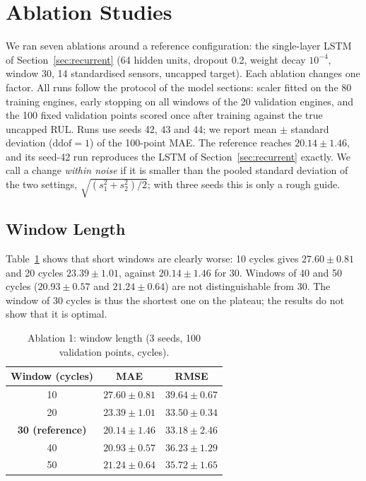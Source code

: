 \section{Ablation Studies}
\label{sec:ablations}

We ran seven ablations around a reference configuration: the single-layer LSTM of Section~\ref{sec:recurrent} (64 hidden units, dropout 0.2, weight decay $10^{-4}$, window 30, 14 standardised sensors, uncapped target).  Each ablation changes one factor.  All runs follow the protocol of the model sections: scaler fitted on the 80 training engines, early stopping on all windows of the 20 validation engines, and the 100 fixed validation points scored once after training against the true uncapped RUL.  Runs use seeds 42, 43 and 44; we report mean $\pm$ standard deviation ($\mathrm{ddof}=1$) of the 100-point MAE.  The reference reaches $20.14\pm1.46$, and its seed-42 run reproduces the LSTM of Section~\ref{sec:recurrent} exactly.  We call a change \emph{within noise} if it is smaller than the pooled standard deviation of the two settings, $\sqrt{(s_1^2+s_2^2)/2}$; with three seeds this is only a rough guide.

\subsection{Window Length}
Table~\ref{tab:ablation_window} shows that short windows are clearly worse: 10 cycles gives $27.60\pm0.81$ and 20 cycles $23.39\pm1.01$, against $20.14\pm1.46$ for 30.  Windows of 40 and 50 cycles ($20.93\pm0.57$ and $21.24\pm0.64$) are not distinguishable from 30.  The window of 30 cycles is thus the shortest one on the plateau; the results do not show that it is optimal.

\begin{table}[t]
\centering
\caption{Ablation 1: window length (3 seeds, 100 validation points, cycles).}
\label{tab:ablation_window}
\footnotesize
\begin{tabular}{ccc}
\toprule
Window (cycles) & MAE & RMSE \\
\midrule
10 & $27.60\pm0.81$ & $39.64\pm0.67$ \\
20 & $23.39\pm1.01$ & $33.50\pm0.34$ \\
\textbf{30 (reference)} & $20.14\pm1.46$ & $33.18\pm2.46$ \\
40 & $20.93\pm0.57$ & $36.23\pm1.29$ \\
50 & $21.24\pm0.64$ & $35.72\pm1.65$ \\
\bottomrule
\end{tabular}
\end{table}

